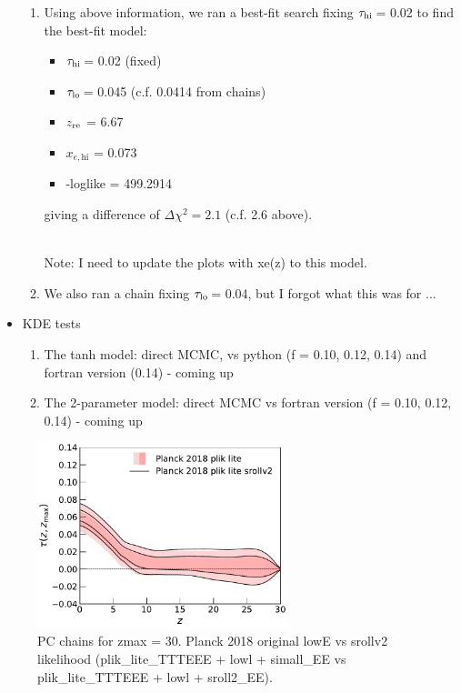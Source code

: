 \documentclass[prd,amsmath,amssymb,floatfix,superscriptaddress,nofootinbib]{revtex4-1}
\newcommand{\tauhi}{$\tau_{\rm hi}\,$}
\newcommand{\taulo}{$\tau_{\rm lo}\,$}
\begin{document}
\begin{itemize}
{\begin{enumerate}
{\begin{itemize}
                \item {$x_{e, \mathrm{hi}}$ = 0.0214}
                \item {-loglike = 498.2425} 
            \end{itemize}
             }
            \item{Using above information, we ran a best-fit search fixing \tauhi = 0.02 to find the best-fit model:
            \begin{itemize}
                \item {\tauhi = 0.02 (fixed)}
                \item {\taulo = 0.045 (c.f. 0.0414 from chains)} 
                \item {$z_{\rm re}$ = 6.67} 
                \item {$x_{e, \mathrm{hi}}$ = 0.073}
                \item {-loglike = 499.2914} 
            \end{itemize} 
            giving a difference of $\Delta \chi^2 = 2.1$  (c.f. 2.6 above).}\\
            Note: I need to update the plots with xe(z) to this model.
            \item{We also ran a chain fixing \taulo = 0.04, but I forgot what this was for ...}
        \end{enumerate}
        }
        
    \item {KDE tests
        \begin{enumerate}
            \item {The tanh model: direct MCMC, vs python (f = 0.10, 0.12, 0.14) and fortran version (0.14) - coming up}
            \item {The 2-parameter model: direct MCMC vs fortran version (f = 0.10, 0.12, 0.14) - coming up}
        \end{enumerate}
    }
    
\end{itemize} 



\begin{figure}
\includegraphics[width=0.65\textwidth]{results/direct_mcmc/pl18_plots_zmax30/plot_pub_tau_gtz_dz_0p1_pl18_pc_zmax30_pliklite_post_0930_and_pl18_pc_zmax30_pliklite_srollv2_0930.pdf}
\caption{PC chains for zmax = 30. Planck 2018 original lowE vs srollv2 likelihood (plik\_lite\_TTTEEE + lowl + simall\_EE vs plik\_lite\_TTTEEE + lowl + sroll2\_EE).
}
\label{fig:}
\end{figure}
\end{document}
